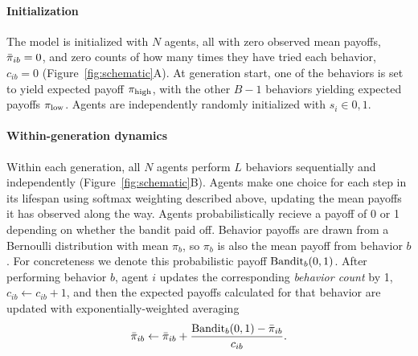 \documentclass[letterpaper,11.5pt]{scrartcl}
\begin{document}
\paragraph{Initialization}

The model is initialized with $N$ agents, all with zero observed mean payoffs, 
$\bar\pi_{ib} = 0$, and zero counts of how many times
they have tried each behavior, $c_{ib} = 0$ (Figure~\ref{fig:schematic}A).
At generation start, one of the behaviors is set to 
yield expected payoff $\pi_{\mathrm{high}}$, with the other $B-1$ behaviors yielding
expected payoffs $\pi_{\mathrm{low}}$. Agents are independently randomly initialized with $s_i
\in 0,1$.


\paragraph{Within-generation dynamics}

Within each generation, all $N$ agents perform $L$ behaviors sequentially and
independently (Figure~\ref{fig:schematic}B).
Agents make one choice for each step in its lifespan using softmax weighting
described above, updating the mean payoffs it has observed along the way. 
Agents probabilistically recieve a payoff of 0 or 1 depending on whether the
bandit paid off. Behavior payoffs are drawn from a 
Bernoulli distribution with mean $\pi_b$, so $\pi_b$ is also the mean payoff from
behavior $b$.  For concreteness we denote this probabilistic payoff
$\text{Bandit}_b(0, 1)$. After performing behavior $b$, agent $i$ updates the
corresponding \emph{behavior count} by 1, $c_{ib} \leftarrow c_{ib} + 1$, and then
the expected payoffs calculated for that behavior are updated with
exponentially-weighted averaging
\begin{equation}
  \bar\pi_{ib} \leftarrow \bar\pi_{ib} + \frac{\text{Bandit}_b(0, 1) - \bar\pi_{ib}}{c_{ib}}.
\end{equation}
\noindent
\end{document}
